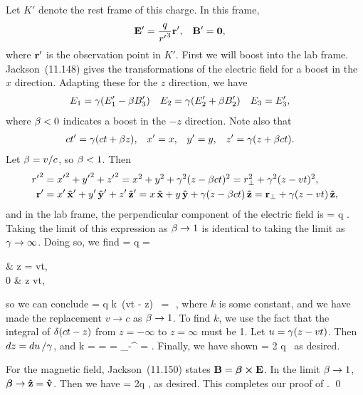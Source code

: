 \begin{solution}
	Let $K'$ denote the rest frame of this charge.  In this frame,
	\begin{align*}
		\vb{E}' &= \frac{q}{{r'}^3} \vb{r}', &
		\vb{B}' &= \mathbf{0},
	\end{align*}
	where $\vb{r}'$ is the observation point in $K'$.
\clearpage
	First we will boost into the lab frame.  Jackson~(11.148) gives the transformations of the electric field for a boost in the $x$ direction.  Adapting these for the $z$ direction, we have
	\begin{align*}
		E_1 &= \gamma (E_1' - \beta B_3') &
		E_2 &= \gamma (E_2' + \beta B_2') &
		E_3 &= E_3',
	\end{align*}
	where $\beta < 0$ indicates a boost in the $-z$ direction.  Note also that
	\begin{align*}
		ct' &= \gamma (c t + \beta z), &
		x' &= x, &
		y' &= y, &
		z' &= \gamma (z + \beta c t).
	\end{align*}
	Let $\beta = v / c$, so $\beta < 1$.  Then
	\begin{align*}
		{r'}^2 &= {x'}^2 + {y'}^2 + {z'}^2
		= x^2 + y^2 + \gamma^2 (z - \beta c t)^2
		= r_\perp^2 + \gamma^2 (z - v t)^2, \\
		\vb{r}' &= x' \,\vb{\hat{x}}' + y' \,\vb{\hat{y}}' + z' \,\vb{\hat{z}}'
		= x \,\vb{\hat{x}} + y \,\vb{\hat{y}} + \gamma (z - \beta c t)\,\vb{\hat{z}}
		= \vb{r}_\perp + \gamma (z - v t)\,\vb{\hat{z}},
	\end{align*}
	and in the lab frame, the perpendicular component of the electric field is
	\beq
		\vEperp = \gam q .
	\eeq
	Taking the limit of this expression as $\beta \to 1$ is identical to taking the limit as $\gamma \to \infty$.  Doing so, we find
	\beq
		\limgam \vEperp = q \vrperp \limgam {}
		= \begin{cases}
			\infty & \tif z = vt, \\
			0 & z \neq vt,
		\end{cases}
	\eeq
	so we can conclude
	\beq
		\limgam \vEperp = q k \,\del(vt - z) \,\vrperp
		= \,\delctz \,\vrperp,
	\eeq
	where $k$ is some constant, and we have made the replacement $v \to c$ as $\beta \to 1$.  To find $k$, we use the fact that the integral of $\delta(ct - z)$ from $z = -\infty$ to $z = \infty$ must be 1.  Let $u = \gamma (z - vt)$.  Then $\dd{z} = \dd{u} / \gamma$, and
	\beq
		k = \intii {} \dz
		= \intii {}
		= _{-\infty}^\infty
		= .
	\eeq
	Finally, we have shown
	\beq
		\vEperp = 2 q  \,\delctz
	\eeq
	as desired.
	
	For the magnetic field, Jackson~(11.150) states $\vb{B} = \boldsymbol{\beta} \cross \vb{E}$.  In the limit $\beta \to 1$, $\boldsymbol{\beta} \to \vb{\hat{z}} = \vb{\hat{v}}$.  Then we have
	\beq
		\vB = 2q  \delctz,
	\eeq
	as desired.  This completes our proof of . \qed
\end{solution}



